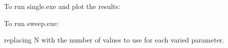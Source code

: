 To run {\ttfamily single.\+exe} and plot the results\+: 
\begin{DoxyCode}{0}
\end{DoxyCode}


To run {\ttfamily sweep.\+exe}\+: 
\begin{DoxyCode}{0}
\end{DoxyCode}
 replacing N with the number of values to use for each varied parameter. 